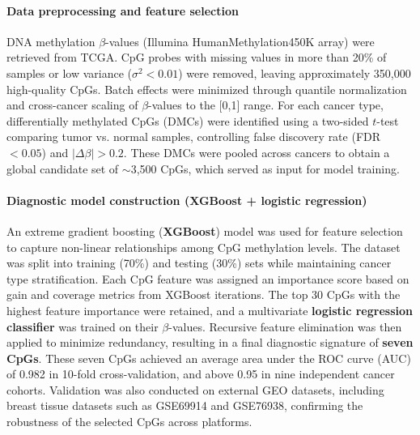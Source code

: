 \documentclass[10pt]{extarticle}
\begin{document}
\paragraph{Data preprocessing and feature selection}
DNA methylation $\beta$-values (Illumina HumanMethylation450K array) were retrieved from TCGA. CpG probes with missing values in more than 20\% of samples or low variance ($\sigma^2 < 0.01$) were removed, leaving approximately 350,000 high-quality CpGs. Batch effects were minimized through quantile normalization and cross-cancer scaling of $\beta$-values to the [0,1] range.  
For each cancer type, differentially methylated CpGs (DMCs) were identified using a two-sided $t$-test comparing tumor vs. normal samples, controlling false discovery rate (FDR $<0.05$) and $|\Delta\beta| > 0.2$. These DMCs were pooled across cancers to obtain a global candidate set of $\sim$3,500 CpGs, which served as input for model training.

\paragraph{Diagnostic model construction (XGBoost + logistic regression)}
An extreme gradient boosting (\textbf{XGBoost}) model was used for feature selection to capture non-linear relationships among CpG methylation levels. The dataset was split into training (70\%) and testing (30\%) sets while maintaining cancer type stratification. Each CpG feature was assigned an importance score based on gain and coverage metrics from XGBoost iterations.  
The top 30 CpGs with the highest feature importance were retained, and a multivariate \textbf{logistic regression classifier} was trained on their $\beta$-values. Recursive feature elimination was then applied to minimize redundancy, resulting in a final diagnostic signature of \textbf{seven CpGs}.  
These seven CpGs achieved an average area under the ROC curve (AUC) of 0.982 in 10-fold cross-validation, and above 0.95 in nine independent cancer cohorts. Validation was also conducted on external GEO datasets, including breast tissue datasets such as GSE69914 and GSE76938, confirming the robustness of the selected CpGs across platforms.
\end{document}
